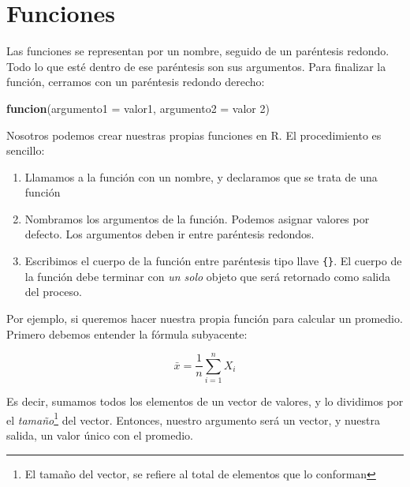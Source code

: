\documentclass[12pt,letterpaper,]{book}
\newenvironment{Shaded}{\begin{snugshade}}{\end{snugshade}}
\newcommand{\KeywordTok}[1]{\textcolor[rgb]{0.13,0.29,0.53}{\textbf{#1}}}
\newcommand{\DataTypeTok}[1]{\textcolor[rgb]{0.13,0.29,0.53}{#1}}
\newcommand{\DecValTok}[1]{\textcolor[rgb]{0.00,0.00,0.81}{#1}}
\newcommand{\NormalTok}[1]{#1}
\let\rmarkdownfootnote\footnote%
\def\footnote{\protect\rmarkdownfootnote}
\begin{document}
\section{Funciones}\label{funciones}

Las funciones se representan por un nombre, seguido de un paréntesis
redondo. Todo lo que esté dentro de ese paréntesis son sus argumentos.
Para finalizar la función, cerramos con un paréntesis redondo derecho:

\begin{Shaded}
\begin{Highlighting}[]
\KeywordTok{funcion}\NormalTok{(}\DataTypeTok{argumento1 =}\NormalTok{ valor1,  }\DataTypeTok{argumento2 =}\NormalTok{ valor }\DecValTok{2}\NormalTok{)}
\end{Highlighting}
\end{Shaded}

Nosotros podemos crear nuestras propias funciones en R. El procedimiento
es sencillo:

\begin{enumerate}
\def\labelenumi{\arabic{enumi}.}
\item
  Llamamos a la función con un nombre, y declaramos que se trata de una
  función
\item
  Nombramos los argumentos de la función. Podemos asignar valores por
  defecto. Los argumentos deben ir entre paréntesis redondos.
\item
  Escribimos el cuerpo de la función entre paréntesis tipo llave
  \texttt{\{\}}. El cuerpo de la función debe terminar con \emph{un
  solo} objeto que será retornado como salida del proceso.
\end{enumerate}

Por ejemplo, si queremos hacer nuestra propia función para calcular un
promedio. Primero debemos entender la fórmula subyacente:

\[
\bar{x}= \frac{1}{n} \sum_{i=1}^{n} X_i
\]

Es decir, sumamos todos los elementos de un vector de valores, y lo
dividimos por el
\emph{tamaño}\footnote{El tamaño del vector, se refiere al total de elementos que lo conforman}
del vector. Entonces, nuestro argumento será un vector, y nuestra
salida, un valor único con el promedio.
\end{document}
